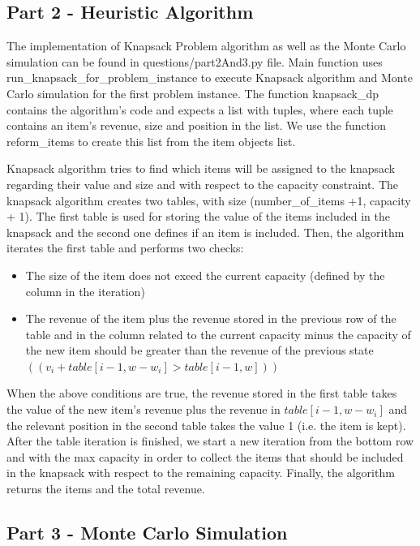 \documentclass[12pt]{article}
\begin{document}
    \subsection{Part 2 - Heuristic Algorithm}
    
    The implementation of Knapsack Problem algorithm as well as the Monte Carlo simulation can be found in questions/part2And3.py file. Main function uses run\_knapsack\_for\_problem\_instance to execute Knapsack algorithm and Monte Carlo simulation for the first problem instance. The function knapsack\_dp contains the algorithm's code and expects a list with tuples, where each tuple contains an item's revenue, size and position in the list. We use the function reform\_items to create this list from the item objects list.
    
    Knapsack algorithm tries to find which items will be assigned to the knapsack regarding their value and size and with respect to the capacity constraint. The knapsack algorithm creates two tables, with size (number\_of\_items +1, capacity + 1). The first table is used for storing the value of the items included in the knapsack and the second one defines if an item is included. Then, the algorithm iterates the first table and performs two checks:
    
    \begin{itemize}
        \item  The size of the item does not exeed the current capacity (defined by the column in the iteration)
        \item The revenue of the item plus the revenue stored in the previous row of the table and in the column related to the current capacity minus the capacity of the new item should be greater than the revenue of the previous state $((v_i + table[i - 1, w - w_i] > table[i - 1, w]))$
    \end{itemize}

When the above conditions are true, the revenue stored in the first table takes the value of the new item's revenue plus the revenue in $table[i-1, w-w_i]$ and the relevant position in the second table takes the value 1 (i.e. the item is kept). After the table iteration is finished, we start a new iteration from the bottom row and with the max capacity in order to collect the items that should be included in the knapsack with respect to the remaining capacity. Finally, the algorithm returns the items and the total revenue.
    
    \subsection{Part 3 - Monte Carlo Simulation}
    
\end{document}
